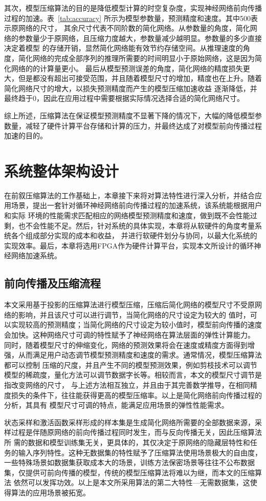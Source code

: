 其次，模型压缩算法的目的是降低模型计算的时空复杂度，实现神经网络前向传播过程的加速。表~\ref{tab:accuracy} 所示为模型参数量，预测精度和速度。其中500表示原网络的尺寸，
其余尺寸代表不同阶数的简化网络。从参数量的角度，简化网络的参数量少于原网络，且压缩力度越大，参数量减少越明显。参数量的多少直接决定着模型
的存储开销，显然简化网络能有效节约存储空间。从推理速度的角度，简化网络的完成全部序列的推理所需要的时间明显小于原始网络，这是因为简化网络的的计算量更小。
最后从模型预测误差的角度，简化网络的精度损失更大，但是都没有超出可接受范围，并且随着模型尺寸的增加，精度也在上升。随着简化网络尺寸的增大，以损失预测精度而产生的模型压缩加速收益
逐渐降低，并最终趋于0，因此在应用过程中需要根据实际情况选择合适的简化网络尺寸。

综上所述，压缩算法在保证模型预测精度不显著下降的情况下，大幅的降低模型参数量，减轻了硬件计算平台存储和计算的压力，并最终达成了对模型前向传播过程加速的目的。

\section{系统整体架构设计}
在前叙压缩算法的工作基础上，本章接下来将对算法特性进行深入分析，并结合应用场景，提出一套针对循环神经网络前向传播过程的加速系统，该系统能根据用户和实际
环境的性能需求匹配相应的网络模型预测精度和速度，做到既不会性能过剩，也不会性能不足。然后，针对系统的具体实现，本章将从软硬件的角度考量系统各个组成部分实现的成本和收益，
并进行软硬件划分与协同，以最大化系统的实现效率。最后，本章将选用FPGA作为硬件计算平台，实现本文所设计的循环神经网络加速系统。
\subsection{前向传播及压缩流程}
本文采用基于投影的压缩算法进行模型压缩，压缩后简化网络的模型尺寸不受原网络的影响，并且该尺寸可以进行调节，当简化网络的尺寸设定为较大的
值时，可以实现较高的预测精度；当简化网络的尺寸设定为较小值时，模型前向传播的速度会加快。这种网络尺寸可调的特性赋予了神经网络在算法层面的弹性计算能力。
同时，随着模型尺寸的伸缩变化，网络的预测效果将会在速度或精度方面得到增强，从而满足用户动态调节模型预测精度和速度的需求。通常情况，模型压缩算法都可以控制
压缩的尺度，并且产生不同的模型预测效果，例如剪枝技术可以调节模型的稀疏度，量化方法可以调节数据字长等。相较而言，本文的模型尺寸调节是指改变网络的尺寸，
与上述方法相互独立，并且由于其完善数学推导，在相同精度损失的条件下，往往能获得更高的模型压缩率。以上是简化网络前向传播过程的分析，其具有
模型尺寸可调的特点，能满足应用场景的弹性性能需求。

状态采样和激活函数采样形成的样本集是生成简化网络所需要的全部数据来源，采样过程是伴随原网络的前向传播过程同时发生，而与反向传播无关，因此压缩算法所
需的数据和模型训练集无关，更具体的，其仅决定于原网络的隐藏层特性和任务的输入序列特性。这种无数据集的特性赋予了压缩算法使用场景极大的自由度，
一些特殊场景如数据集获取成本大的场景，训练方法保密场景等往往不公布数据集，仅提供可前向传播的模型，传统的模型压缩算法将难以为继，而本文的压缩算法
依然可以发挥功效。以上是本文所采用算法的第二大特性---无需数据集，这使得算法的应用场景被拓宽。

